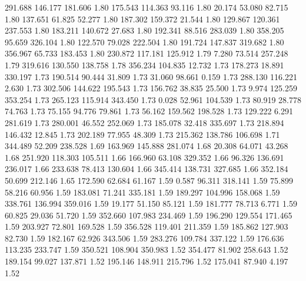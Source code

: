  291.688  146.177  181.606         1.80
 175.543  114.363   93.116         1.80
  20.174   53.080   82.715         1.80
 137.651   61.825   52.277         1.80
 187.302  159.372   21.544         1.80
 129.867  120.361  237.553         1.80
 183.211  140.672   27.683         1.80
 192.341   88.516  283.039         1.80
 358.205   95.659  326.104         1.80
 122.570   79.028  222.504         1.80
 191.724  147.837  319.682         1.80
 356.967   65.733  183.453         1.80
 230.872  117.181  125.912         1.79
   7.280   73.514  257.248         1.79
 319.616  130.550  138.758         1.78
 356.234  104.835   12.732         1.73
 178.273   18.891  330.197         1.73
 190.514   90.444   31.809         1.73
  31.060   98.661    0.159         1.73
 288.130  116.221    2.630         1.73
 302.506  144.622  195.543         1.73
 156.762   38.835   25.500         1.73
   9.974  125.259  353.254         1.73
 265.123  115.914  343.450         1.73
   0.028   52.961  104.539         1.73
  80.919   28.778   74.763         1.73
  75.155   94.776   79.861         1.73
  56.162  159.562  198.528         1.73
 129.222    6.291  281.619         1.73
 280.001   46.552  252.069         1.73
 185.078   32.418  335.697         1.73
 218.894  146.432   12.845         1.73
 202.189   77.955   48.309         1.73
 215.362  138.786  106.698         1.71
 344.489   52.209  238.528         1.69
 163.969  145.888  281.074         1.68
  20.308   64.071   43.268         1.68
 251.920  118.303  105.511         1.66
 166.960   63.108  329.352         1.66
  96.326  136.691  236.017         1.66
 233.638   78.413  130.604         1.66
 345.414  138.731  327.685         1.66
 352.184   50.699  212.146         1.65
 172.590   62.684   61.167         1.59
   0.587   96.311  318.141         1.59
  75.899   58.216   60.956         1.59
 183.081   71.241  335.181         1.59
 189.297  104.996  158.068         1.59
 338.761  136.994  359.016         1.59
  19.177   51.150   85.121         1.59
 181.777   78.713    6.771         1.59
  60.825   29.036   51.720         1.59
 352.660  107.983  234.469         1.59
 196.290  129.554  171.465         1.59
 203.927   72.801  169.528         1.59
 356.528  119.401  211.359         1.59
 185.862  127.903   82.730         1.59
 182.167   62.926  343.506         1.59
 283.276  109.784  337.122         1.59
 176.636  113.235  233.747         1.59
 350.521  108.904  350.983         1.52
 354.477   81.902  258.643         1.52
 189.154   99.027  137.871         1.52
 195.146  148.911  215.796         1.52
 175.041   87.940    4.197         1.52
